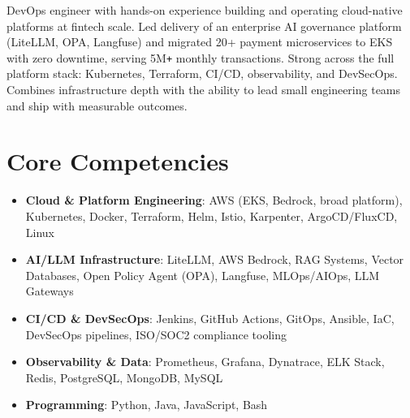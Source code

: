 \documentclass[11pt,a4paper,sans]{moderncv}
\begin{document}
\makecvtitle


\vspace{6pt}
\small{DevOps engineer with hands-on experience building and operating cloud-native platforms at fintech scale. Led delivery of an enterprise AI governance platform (LiteLLM, OPA, Langfuse) and migrated 20+ payment microservices to EKS with zero downtime, serving 5M\texttt{+} monthly transactions. Strong across the full platform stack: Kubernetes, Terraform, CI/CD, observability, and DevSecOps. Combines infrastructure depth with the ability to lead small engineering teams and ship with measurable outcomes.}


\section{Core Competencies}
\vspace{1pt}
\begin{itemize}

\item \textbf{Cloud \& Platform Engineering}: AWS (EKS, Bedrock, broad platform), Kubernetes, Docker, Terraform, Helm, Istio, Karpenter, ArgoCD/FluxCD, Linux

\item \textbf{AI/LLM Infrastructure}: LiteLLM, AWS Bedrock, RAG Systems, Vector Databases, Open Policy Agent (OPA), Langfuse, MLOps/AIOps, LLM Gateways

\item \textbf{CI/CD \& DevSecOps}: Jenkins, GitHub Actions, GitOps, Ansible, IaC, DevSecOps pipelines, ISO/SOC2 compliance tooling

\item \textbf{Observability \& Data}: Prometheus, Grafana, Dynatrace, ELK Stack, Redis, PostgreSQL, MongoDB, MySQL

\item \textbf{Programming}: Python, Java, JavaScript, Bash

\end{itemize}

\end{document}
